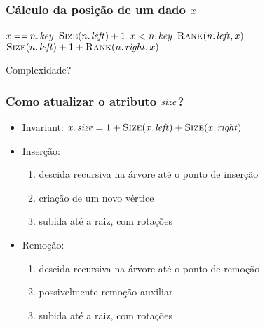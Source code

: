 \documentclass{beamer}
\begin{document}
\begin{frame}
\frametitle{Cálculo da posição de um dado $x$}

\begin{codebox}
\li \If $x \isequal \attrib{n}{key}$
\li \Then \Return $\proc{Size}(\attrib{n}{left}) + 1$
\li \ElseIf $x < \attrib{n}{key}$
\li \Then \Return $\proc{Rank}(\attrib{n}{left}, x)$
\li \ElseNoIf \Return $\proc{Size}(\attrib{n}{left}) + 1 + \proc{Rank}(\attrib{n}{right}, x)$
  \End
\end{codebox}

\pause
\alert{Complexidade?}

\end{frame}

\begin{frame}
\frametitle{Como atualizar o atributo $\id{size}$?}

\begin{itemize}
\item Invariant: $\attrib{x}{size} = 1 + \proc{Size}(\attrib{x}{left}) + \proc{Size}(\attrib{x}{right})$
\item Inserção:
\begin{enumerate}
\item descida recursiva na árvore até o ponto de inserção
\item criação de um novo vértice
\item subida até a raiz, com rotações
\end{enumerate}
\item Remoção:
\begin{enumerate}
\item descida recursiva na árvore até o ponto de remoção
\item possivelmente remoção auxiliar
\item subida até a raiz, com rotações
\end{enumerate}
\end{itemize}
\end{frame}
\end{document}

